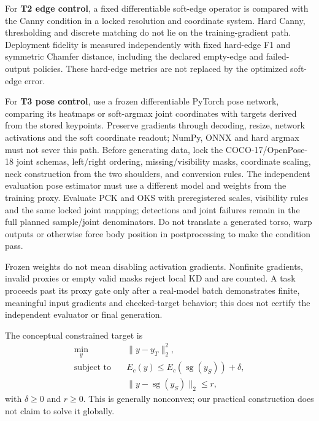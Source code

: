 \documentclass[11pt]{article}
\newcommand{\sg}{\operatorname{sg}}
\begin{document}
For \textbf{T2 edge control}, a fixed differentiable soft-edge operator is compared with the Canny condition in a locked resolution and coordinate system. Hard Canny, thresholding and discrete matching do not lie on the training-gradient path. Deployment fidelity is measured independently with fixed hard-edge F1 and symmetric Chamfer distance, including the declared empty-edge and failed-output policies. These hard-edge metrics are not replaced by the optimized soft-edge error.

For \textbf{T3 pose control}, use a frozen differentiable PyTorch pose network, comparing its heatmaps or soft-argmax joint coordinates with targets derived from the stored keypoints. Preserve gradients through decoding, resize, network activations and the soft coordinate readout; NumPy, ONNX and hard argmax must not sever this path. Before generating data, lock the COCO-17/OpenPose-18 joint schemas, left/right ordering, missing/visibility masks, coordinate scaling, neck construction from the two shoulders, and conversion rules. The independent evaluation pose estimator must use a different model and weights from the training proxy. Evaluate PCK and OKS with preregistered scales, visibility rules and the same locked joint mapping; detections and joint failures remain in the full planned sample/joint denominators. Do not translate a generated torso, warp outputs or otherwise force body position in postprocessing to make the condition pass.

Frozen weights do not mean disabling activation gradients. Nonfinite gradients, invalid proxies or empty valid masks reject local KD and are counted. A task proceeds past its proxy gate only after a real-model batch demonstrates finite, meaningful input gradients and checked-target behavior; this does not certify the independent evaluator or final generation.

The conceptual constrained target is
\begin{align}
 \min_y\quad &\|y-y_T\|_2^2,\label{eq:ideal}\\
 \text{subject to}\quad&E_c(y)\le E_c(\sg(y_S))+\delta,\nonumber\\
 &\|y-\sg(y_S)\|_2\le r,\nonumber
\end{align}
with $\delta\ge0$ and $r\ge0$. This is generally nonconvex; our practical construction does not claim to solve it globally.
\end{document}
